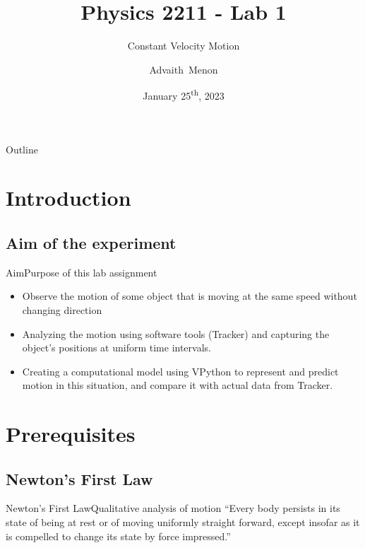 \documentclass{beamer}
\title[PHYS-2211-Lab01] %
{Physics 2211 - Lab 1}
\subtitle
{Constant Velocity Motion} %
\author[Menon, Advaith] %
{Advaith~Menon\inst{1}}
\institute%
{
  \inst{1}%
  Computer Engineering\\
  Georgia Institute of Technology
  }
\date%
{January 25\textsuperscript{th}, 2023}
\begin{document}
\begin{frame}
  \titlepage
\end{frame}

\begin{frame}{Outline}
  \tableofcontents
\end{frame}




\section{Introduction}
\subsection[Aim]{Aim of the experiment}
\begin{frame}{Aim}{Purpose of this lab assignment}
	\begin{itemize}
	\item Observe the motion of some object that is moving at the same speed without changing direction
	\item Analyzing the motion using software tools (Tracker) and capturing the object's positions at uniform time intervals.
	\item Creating a computational model using VPython to represent and predict motion in this situation, and compare it with actual data from Tracker.
	\end{itemize}
\end{frame}

\section{Prerequisites}
\subsection{Newton's First Law}
\begin{frame}{Newton's First Law}{Qualitative analysis of motion}
	``Every body persists in its state of being at rest
	or of moving uniformly straight forward, except
	insofar as it is compelled to change its state by
	force impressed.''
\end{frame}
\end{document}
